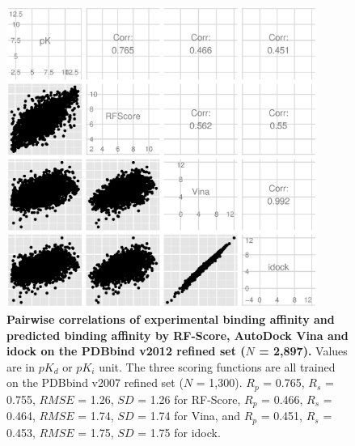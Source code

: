 \documentclass[10pt]{article}
\begin{document}
\begin{figure}[!ht]
\begin{center}
\includegraphics[width=4in]{PDBbind2012Correlations.eps}
\end{center}
\caption{
{\bf Pairwise correlations of experimental binding affinity and predicted binding affinity by RF-Score, AutoDock Vina and idock on the PDBbind v2012 refined set ($N$ = 2,897).} Values are in $pK_d$ or $pK_i$ unit. The three scoring functions are all trained on the PDBbind v2007 refined set ($N$ = 1,300). $R_p$ = 0.765, $R_s$ = 0.755, $RMSE$ = 1.26, $SD$ = 1.26 for RF-Score, $R_p$ = 0.466, $R_s$ = 0.464, $RMSE$ = 1.74, $SD$ = 1.74 for Vina, and $R_p$ = 0.451, $R_s$ = 0.453, $RMSE$ = 1.75, $SD$ = 1.75 for idock.
}
\label{PDBbind2012Correlations}
\end{figure}
\end{document}
